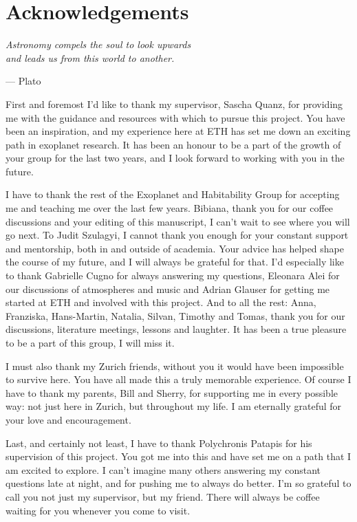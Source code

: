 

\chapter*{Acknowledgements}

\begin{flushright}
{\itshape
Astronomy compels the soul to look upwards \\and leads us from this world to another.}

\vspace{0.5em}
--- Plato
\end{flushright}

First and foremost I'd like to thank my supervisor, Sascha Quanz, for providing me with the guidance and resources with which to pursue this project.
You have been an inspiration, and my experience here at ETH has set me down an exciting path in exoplanet research.
It has been an honour to be a part of the growth of your group for the last two years, and I look forward to working with you in the future.

I have to thank the rest of the Exoplanet and Habitability Group for accepting me and teaching me over the last few years. 
Bibiana, thank you for our coffee discussions and your editing of this manuscript, I can't wait to see where you will go next.
To Judit Szulagyi, I cannot thank you enough for your constant support and mentorship, both in and outside of academia. 
Your advice has helped shape the course of my future, and I will always be grateful for that.
I'd especially like to  thank Gabrielle Cugno for always answering my questions, Eleonara Alei for our discussions of atmospheres and music and Adrian Glauser for getting me started at ETH and involved with this project.
And to all the rest: Anna, Franziska, Hans-Martin, Natalia, Silvan, Timothy and Tomas, thank you for our discussions, literature meetings, lessons and laughter. 
It has been a true pleasure to be a part of this group, I will miss it.

I must also thank my Zurich friends, without you it would have been impossible to survive here.
You have all made this a truly memorable experience.
Of course I have to thank my parents, Bill and Sherry, for supporting me in every possible way: not just here in Zurich, but throughout my life. 
I am eternally grateful for your love and encouragement.

Last, and certainly not least, I have to thank Polychronis Patapis for his supervision of this project. 
You got me into this and have set me on a path that I am excited to explore.
I can't imagine many others answering my constant questions late at night, and for pushing me to always do better. 
I'm so grateful to call you not just my supervisor, but my friend. 
There will always be coffee waiting for you whenever you come to visit.

\bigskip
\bigskip
